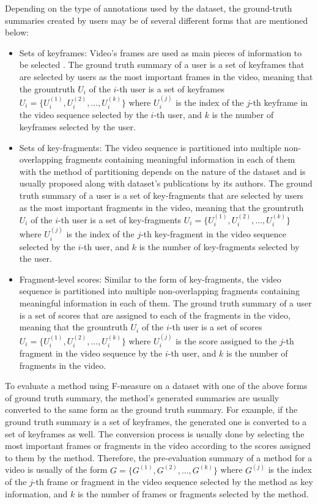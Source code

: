             Depending on the type of annotations used by the dataset, the ground-truth summaries created by users may be of several different forms that are mentioned below:

            \begin{itemize}
                \item Sets of keyframes: Video's frames are used as main pieces of information to be selected . The ground truth summary of a user is a set of keyframes that are selected by users as the most important frames in the video, meaning that the grountruth $U_i$ of the $i$-th user is a set of keyframes $U_i = \{U_{i}^{(1)}, U_{i}^{(2)}, ..., U_{i}^{(k)}\}$ where $U_{i}^{(j)}$ is the index of the $j$-th keyframe in the video sequence selected by the $i$-th user, and $k$ is the number of keyframes selected by the user.
                \item Sets of key-fragments: The video sequence is partitioned into multiple non-overlapping fragments containing meaningful information in each of them with the method of partitioning depends on the nature of the dataset and is usually proposed along with dataset's publications by its authors. The ground truth summary of a user is a set of key-fragments that are selected by users as the most important fragments in the video, meaning that the grountruth $U_i$ of the $i$-th user is a set of key-fragments $U_i = \{U_{i}^{(1)}, U_{i}^{(2)}, ..., U_{i}^{(k)}\}$ where $U_{i}^{(j)}$ is the index of the $j$-th key-fragment in the video sequence selected by the $i$-th user, and $k$ is the number of key-fragments selected by the user.
                \item Fragment-level scores: Similar to the form of key-fragments, the video sequence is partitioned into multiple non-overlapping fragments containing meaningful information in each of them. The ground truth summary of a user is a set of scores that are assigned to each of the fragments in the video, meaning that the grountruth $U_i$ of the $i$-th user is a set of scores $U_i = \{U_{i}^{(1)}, U_{i}^{(2)}, ..., U_{i}^{(k)}\}$ where $U_{i}^{(j)}$ is the score assigned to the $j$-th fragment in the video sequence by the $i$-th user, and $k$ is the number of fragments in the video.
            \end{itemize}

            To evaluate a method using F-measure on a dataset with one of the above forms of ground truth summary, the method's generated summaries are usually converted to the same form as the ground truth summary. For example, if the ground truth summary is a set of keyframes, the generated one is converted to a set of keyframes as well. The conversion process is usually done by selecting the most important frames or fragments in the video according to the scores assigned to them by the method. Therefore, the pre-evaluation summary of a method for a video is usually of the form $G = \{G^{(1)}, G^{(2)}, ..., G^{(k)}\}$ where $G^{(j)}$ is the index of the $j$-th frame or fragment in the video sequence selected by the method as key information, and $k$ is the number of frames or fragments selected by the method.

